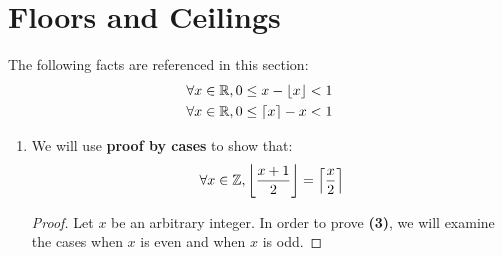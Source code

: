 \documentclass[12pt]{article}
\theoremstyle{definition}
\begin{document}
\newpage
\section{Floors and Ceilings}
\setcounter{equation}{0}
The following facts are referenced in this section:
\begin{align}
    \forall x \in \mathbb R, 0 \leq x-\lfloor x\rfloor<1\\
    \forall x \in \mathbb R, 0 \leq\lceil x\rceil-x<1
\end{align}
\setcounter{case}{0}

\begin{enumerate}
    \item We will use \textbf{proof by cases} to show that:
    \begin{align}
        \forall x \in \mathbb Z, \left \lfloor \frac{x+1}{2} \right \rfloor = \left \lceil \frac{x}{2} \right \rceil
    \end{align}
    \begin{proof}
        Let $x$ be an arbitrary integer. In order to prove \textbf{(3)}, we will examine the cases when $x$ is even and when $x$ is odd.
        

\end{proof}
\end{enumerate}
\end{document}
